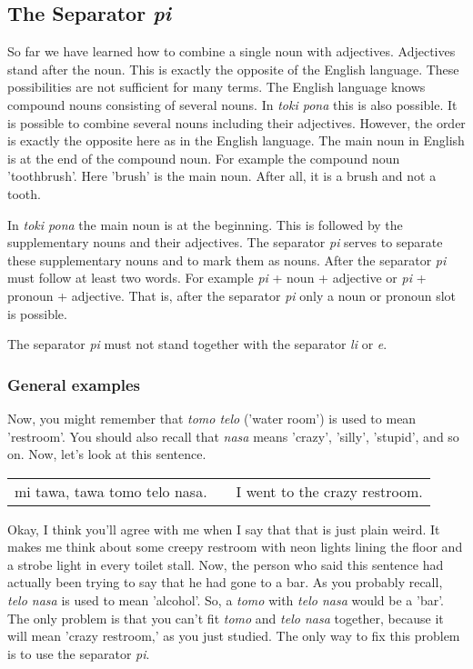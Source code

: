 \subsection*{The Separator \textit{pi}}

So far we have learned how to combine a single noun with adjectives. 
Adjectives stand after the noun. 
This is exactly the opposite of the English language.
These possibilities are not sufficient for many terms. 
The English language knows compound nouns consisting of several nouns. 
In \textit{toki pona} this is also possible. 
It is possible to combine several nouns including their adjectives. 
However, the order is exactly the opposite here as in the English language. 
The main noun in English is at the end of the compound noun. 
For example the compound noun 'toothbrush'. Here 'brush' is the main noun. 
After all, it is a brush and not a tooth. 

In \textit{toki pona} the main noun is at the beginning.
This is followed by the supplementary nouns and their adjectives. 
The separator \textit{pi} serves to separate these supplementary nouns and to mark them as nouns. 
After the separator \textit{pi} must follow at least two words. 
For example \textit{pi} + noun + adjective or \textit{pi} + pronoun + adjective. 
That is, after the separator \textit{pi} only a noun or pronoun slot is possible. 

The separator \textit{pi} must not stand together with the separator \textit{li} or \textit{e}.
%
\subsubsection*{General examples} 
%
Now, you might remember that \textit{tomo telo} ('water room') is used to mean 'restroom'. 
You should also recall that \textit{nasa} means 'crazy', 'silly', 'stupid', and so on. 
Now, let's look at this sentence.

\begin{supertabular}{p{5,5cm}|ll}
mi tawa, tawa tomo telo nasa. && I went to the crazy restroom. \\ %
\end{supertabular}  

Okay, I think you'll agree with me when I say that that is just plain weird. 
It makes me think about some creepy restroom with neon lights lining the floor and a strobe light in every toilet stall. 
Now, the person who said this sentence had actually been trying to say that he had gone to a bar. 
As you probably recall, \textit{telo nasa} is used to mean 'alcohol'. 
So, a \textit{tomo} with \textit{telo nasa} would be a 'bar'. 
The only problem is that you can't fit \textit{tomo} and \textit{telo nasa} together, because it will mean 'crazy restroom,' as you just studied. 
The only way to fix this problem is to use the separator \textit{pi}.

